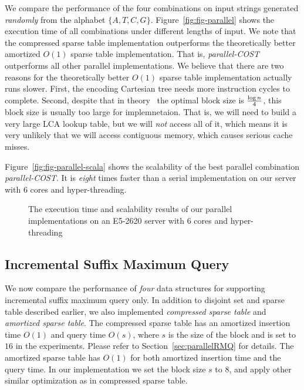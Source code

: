 We compare the performance of the four combinations on input strings
generated {\em randomly} from the alphabet $\{A, T, C, G\}$.
Figure~\ref{fig:fig-parallel} shows the execution time of all
combinations under different lengths of input.  We note that the
compressed sparse table implementation outperforms the theoretically
better amortized $O(1)$ sparse table implementation.  That is, {\em
  parallel-COST} outperforms all other parallel implementations.  We
believe that there are two reasons for the theoretically better $O(1)$
sparse table implementation actually runs slower.  First, the encoding
Cartesian tree needs more instruction cycles to complete.  Second,
despite that in theory~\cite{XXX} the optimal block size is ${\log
  n}\over{4}$, this block size is usually too large for implemnetaion.
That is, we will need to build a very large LCA lookup table, but we
will {\em not} access all of it, which means it is very unlikely that
we will access contiguous memory, which causes serious cache misses.

Figure~\ref{fig:fig-parallel-scala} shows the scalability of the best
parallel combination {\em parallel-COST}.  It is {\em eight} times
faster than a serial implementation on our server with 6 cores and
hyper-threading.

\begin{figure}
  \centering
  \caption{The execution time and scalability results of our parallel
    implementations on an E5-2620 server with 6 cores and
    hyper-threading}
\end{figure}


\subsection{Incremental Suffix Maximum Query}

We now compare the performance of {\em four} data structures for
supporting incremental suffix maximum query only.  In addition to
disjoint set and sparse table described earlier, we also implemented
{\em compressed sparse table} and {\em amortized sparse table}.  The
compressed sparse table has an amortized insertion time $O(1)$ and
query time $O(s)$, where $s$ is the size of the block and is set to
$16$ in the experiments.  Please refer to
Section~\ref{sec:parallelRMQ} for details.  The amortized sparse table
has $O(1)$ for both amortized insertion time and the query time.  In
our implementation we set the block size $s$ to $8$, and apply other
similar optimization as in compressed sparse table.

